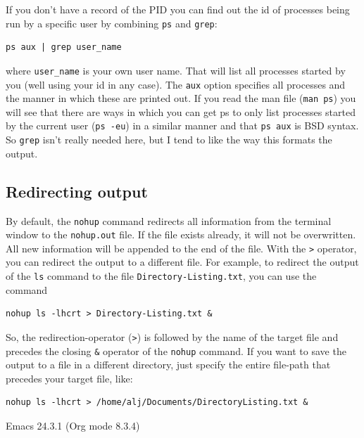 \documentclass[11pt]{article}
\begin{document}
If you don't have a record of the PID you can find out the id of processes being run by a specific user
by combining \texttt{ps} and \texttt{grep}:

\begin{verbatim}
ps aux | grep user_name
\end{verbatim}

where \texttt{user\_name} is your own user name. That will list all processes started by
you (well using your id in any case). The \texttt{aux} option specifies all processes and
the manner in which these are printed out. If you read the man file (\texttt{man ps}) you
will see that there are ways in which you can get ps to only list processes started
by the current user (\texttt{ps -eu}) in a similar manner and that \texttt{ps aux} is BSD syntax.
So \texttt{grep} isn't really needed here, but I tend to like the way this formats the output.

\subsection{Redirecting output}
\label{sec:orgheadline7}
By default, the \texttt{nohup} command redirects all information from the
terminal window to the \texttt{nohup.out} file. If the file exists already,
it will not be overwritten. All new information will be appended to
the end of the file. With the \texttt{>} operator, you can redirect the
output to a different file. For example, to redirect the output of the
\texttt{ls} command to the file \texttt{Directory-Listing.txt}, you can use the
command

\begin{verbatim}
nohup ls -lhcrt > Directory-Listing.txt &
\end{verbatim}

So, the redirection-operator (\texttt{>}) is followed by the name of the
target file and precedes the closing \texttt{\&} operator of the \texttt{nohup}
command. If you want to save the output to a file in a different
directory, just specify the entire file-path that precedes your target
file, like:

\begin{verbatim}
nohup ls -lhcrt > /home/alj/Documents/DirectoryListing.txt &
\end{verbatim}
Emacs 24.3.1 (Org mode 8.3.4)
\end{document}
